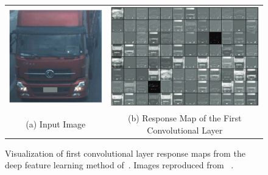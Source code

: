 \begin{figure}[!htb] \centering
\begin{tabular}{cc}
 \includegraphics[width=0.4\linewidth]{image/lit/hu1.png} &
 \includegraphics[width=0.6\linewidth]{image/lit/hu2.png} \\
 (a) Input Image & (b) Response Map of the First Convolutional Layer \\
\end{tabular}
\caption[(a) Sample input image and (b) the response from first convolutional layer]{Visualization of first convolutional layer response maps from the deep feature learning method of~. Images reproduced from
~.
\label{fig:responseFCL}}
\end{figure}

